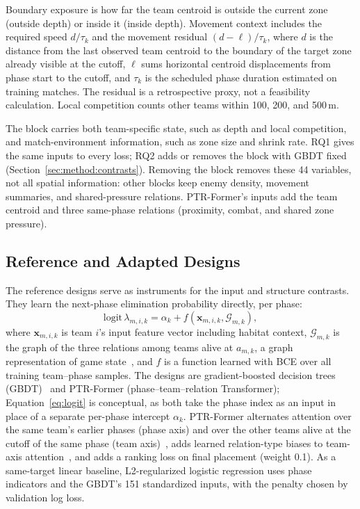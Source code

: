 \documentclass[sigconf,anonymous]{acmart}
\begin{document}
Boundary exposure is how far the team centroid is outside the current zone (outside depth) or inside it (inside depth). Movement context includes the required speed $d/\tau_k$ and the movement residual $(d-\ell)/\tau_k$, where $d$ is the distance from the last observed team centroid to the boundary of the target zone already visible at the cutoff, $\ell$ sums horizontal centroid displacements from phase start to the cutoff, and $\tau_k$ is the scheduled phase duration estimated on training matches. The residual is a retrospective proxy, not a feasibility calculation. Local competition counts other teams within 100, 200, and 500\,m.

The block carries both team-specific state, such as depth and local competition, and match-environment information, such as zone size and shrink rate. RQ1 gives the same inputs to every loss; RQ2 adds or removes the block with GBDT fixed (Section~\ref{sec:method:contrasts}). Removing the block removes these 44 variables, not all spatial information: other blocks keep enemy density, movement summaries, and shared-pressure relations. PTR-Former's inputs add the team centroid and three same-phase relations (proximity, combat, and shared zone pressure).

\subsection{Reference and Adapted Designs}
\label{sec:method:rq2}
The reference designs serve as instruments for the input and structure contrasts. They learn the next-phase elimination probability directly, per phase:
\begin{equation}
\mathrm{logit}\,\lambda_{m,i,k}=\alpha_k+f(\mathbf{x}_{m,i,k},\mathcal{G}_{m,k}),
\label{eq:logit}
\end{equation}
where $\mathbf{x}_{m,i,k}$ is team $i$'s input feature vector including habitat context, $\mathcal{G}_{m,k}$ is the graph of the three relations among teams alive at $a_{m,k}$, a graph representation of game state~\cite{Xenopoulos21}, and $f$ is a function learned with BCE over all training team--phase samples. The designs are gradient-boosted decision trees (GBDT)~\cite{Friedman01} and PTR-Former (phase--team--relation Transformer); Equation~\eqref{eq:logit} is conceptual, as both take the phase index as an input in place of a separate per-phase intercept $\alpha_k$. PTR-Former alternates attention over the same team's earlier phases (phase axis) and over the other teams alive at the cutoff of the same phase (team axis)~\cite{Vaswani17,Ngiam22}, adds learned relation-type biases to team-axis attention~\cite{Ying21}, and adds a ranking loss on final placement (weight 0.1). As a same-target linear baseline, L2-regularized logistic regression uses phase indicators and the GBDT's 151 standardized inputs, with the penalty chosen by validation log loss.
\end{document}
